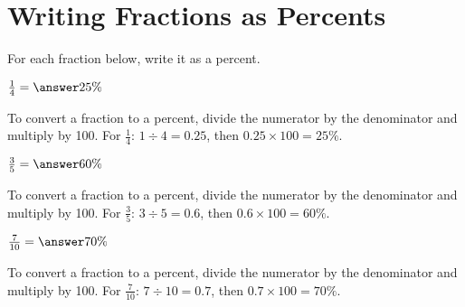 \documentclass{ximera}
\begin{document}


\section*{Writing Fractions as Percents}

For each fraction below, write it as a percent.

\begin{problem}
$\frac{1}{4} = \answer{25\%}$

\begin{feedback}
To convert a fraction to a percent, divide the numerator by the denominator and multiply by 100. For $\frac{1}{4}$: $1 \div 4 = 0.25$, then $0.25 \times 100 = 25\%$.
\end{feedback}

\end{problem}

\begin{problem}
$\frac{3}{5} = \answer{60\%}$

\begin{feedback}
To convert a fraction to a percent, divide the numerator by the denominator and multiply by 100. For $\frac{3}{5}$: $3 \div 5 = 0.6$, then $0.6 \times 100 = 60\%$.
\end{feedback}

\end{problem}

\begin{problem}
$\frac{7}{10} = \answer{70\%}$

\begin{feedback}
To convert a fraction to a percent, divide the numerator by the denominator and multiply by 100. For $\frac{7}{10}$: $7 \div 10 = 0.7$, then $0.7 \times 100 = 70\%$.
\end{feedback}

\end{problem}

\end{document}
